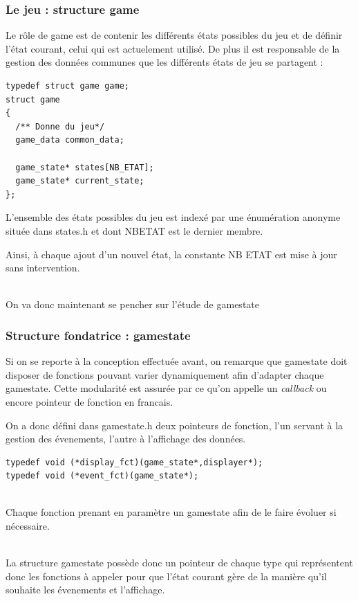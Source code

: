 \subsubsection{Le jeu : structure game}
Le rôle de game est de contenir les différents états possibles du jeu
et de définir l'état courant, celui qui est actuelement utilisé.
De plus il est responsable de la gestion des données communes que les
différents états de jeu se partagent :
\begin{lstlisting}
typedef struct game game;
struct game
{
  /** Donne du jeu*/
  game_data common_data;
    
  game_state* states[NB_ETAT];
  game_state* current_state;
};
\end{lstlisting}
L'ensemble des états possibles du jeu est indexé par une énumération
anonyme située dans states.h et dont NB\textunderscore ETAT est le
dernier membre. 

Ainsi, à chaque ajout d'un nouvel état, la constante NB\textunderscore
ETAT est mise à jour sans intervention.

~\\
On va donc maintenant se pencher sur l'étude de game\textunderscore state
\subsubsection{Structure fondatrice : game\textunderscore state}
Si on se reporte à la conception effectuée avant, on remarque que
game\textunderscore state doit disposer de fonctions pouvant varier
dynamiquement afin d'adapter chaque game\textunderscore state.
Cette modularité est assurée par ce qu'on appelle un \textit{callback} ou encore
pointeur de fonction en francais.

On a donc défini dans game\textunderscore state.h deux pointeurs de
fonction, l'un servant à la gestion des évenements, l'autre à
l'affichage des données.

\begin{lstlisting}
typedef void (*display_fct)(game_state*,displayer*);
typedef void (*event_fct)(game_state*);
\end{lstlisting}
~\\
Chaque fonction prenant en paramètre un game\textunderscore state afin
de le faire évoluer si nécessaire.

~\\
La structure game\textunderscore state possède donc un pointeur de chaque
type qui représentent donc les fonctions à appeler pour que l'état
courant gère de la manière qu'il souhaite les évenements et
l'affichage.

